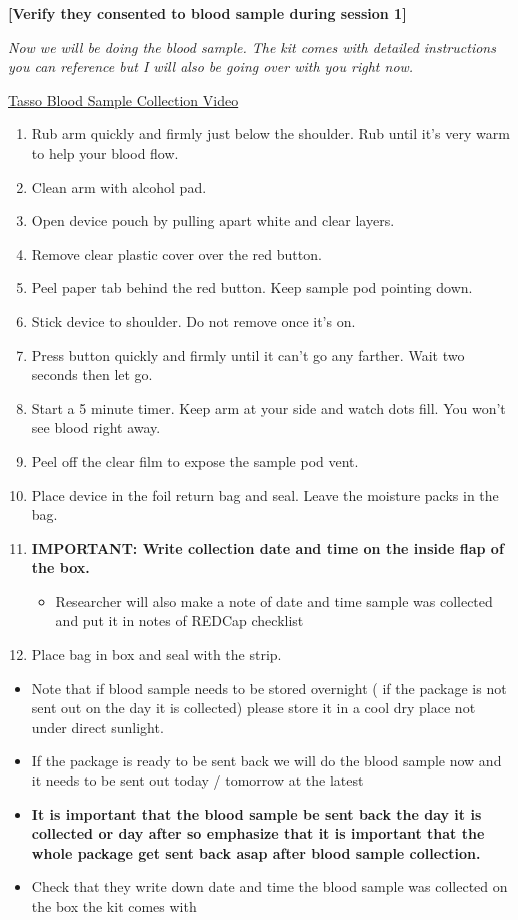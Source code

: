 \documentclass[]{book}
\providecommand{\tightlist}{%
  \setlength{\itemsep}{0pt}\setlength{\parskip}{0pt}}
\begin{document}
\textbf{{[}Verify they consented to blood sample during session 1{]}}

\emph{Now we will be doing the blood sample. The kit comes with detailed instructions you can reference but I will also be going over with you right now. }

\href{https://vimeo.com/409226805}{Tasso Blood Sample Collection Video}

\begin{enumerate}
\def\labelenumi{\arabic{enumi}.}
\item
  Rub arm quickly and firmly just below the shoulder. Rub until it's very warm to help your blood flow.
\item
  Clean arm with alcohol pad.
\item
  Open device pouch by pulling apart white and clear layers.
\item
  Remove clear plastic cover over the red button.
\item
  Peel paper tab behind the red button. Keep sample pod pointing down.
\item
  Stick device to shoulder. Do not remove once it's on.
\item
  Press button quickly and firmly until it can't go any farther. Wait two seconds then let go.
\item
  Start a 5 minute timer. Keep arm at your side and watch dots fill. You won't see blood right away.
\item
  Peel off the clear film to expose the sample pod vent.
\item
  Place device in the foil return bag and seal. Leave the moisture packs in the bag.
\item
  \textbf{IMPORTANT: Write collection date and time on the inside flap of the box.}

  \begin{itemize}
  \tightlist
  \item
    Researcher will also make a note of date and time sample was collected and put it in notes of REDCap checklist
  \end{itemize}
\item
  Place bag in box and seal with the strip.
\end{enumerate}

\begin{itemize}
\item
  Note that if blood sample needs to be stored overnight ( if the package is not sent out on the day it is collected) please store it in a cool dry place not under direct sunlight.
\item
  If the package is ready to be sent back we will do the blood sample now and it needs to be sent out today / tomorrow at the latest
\item
  \textbf{It is important that the blood sample be sent back the day it is collected or day after so emphasize that it is important that the whole package get sent back asap after blood sample collection.}
\item
  Check that they write down date and time the blood sample was collected on the box the kit comes with
\end{itemize}
\end{document}
